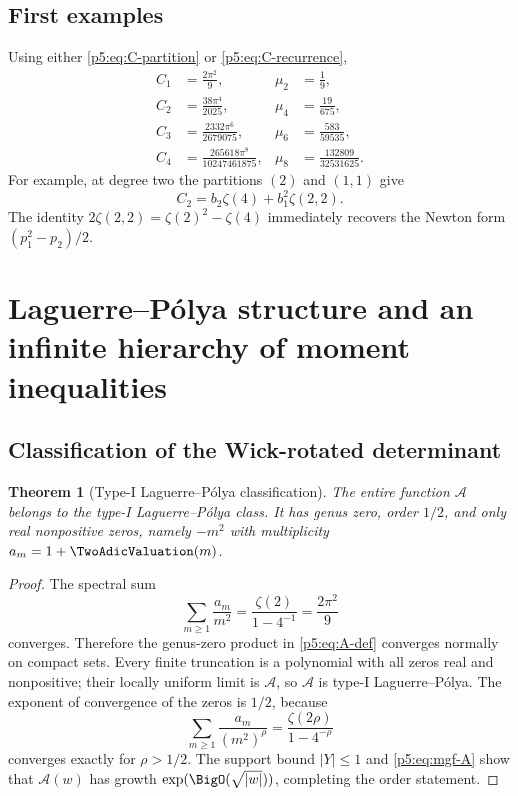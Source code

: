 \documentclass[11pt]{article}
\numberwithin{equation}{section}
\newtheorem{theorem}{Theorem}[section]
\theoremstyle{definition}
\theoremstyle{remark}
\begin{document}
\subsection{First examples}

Using either \cref{p5:eq:C-partition} or \cref{p5:eq:C-recurrence},
\begin{align}
 C_1&=\frac{2\pi^2}{9},
 &\mu_2&=\frac19,\label{p5:eq:first-moments-a}\\
 C_2&=\frac{38\pi^4}{2025},
 &\mu_4&=\frac{19}{675},\\
 C_3&=\frac{2332\pi^6}{2679075},
 &\mu_6&=\frac{583}{59535},\\
 C_4&=\frac{265618\pi^8}{10247461875},
 &\mu_8&=\frac{132809}{32531625}.\label{p5:eq:first-moments-b}
\end{align}
For example, at degree two the partitions $(2)$ and $(1,1)$ give
\begin{equation}\label{p5:eq:C2-MZV}
 C_2=b_2\zeta(4)+b_1^2\zeta(2,2).
\end{equation}
The identity $2\zeta(2,2)=\zeta(2)^2-\zeta(4)$ immediately recovers the
Newton form $(p_1^2-p_2)/2$.

\section{Laguerre--P\'olya structure and an infinite hierarchy of moment inequalities}

\subsection{Classification of the Wick-rotated determinant}

\begin{theorem}[Type-I Laguerre--P\'olya classification]\label{p5:thm:LP}
The entire function $\mathcal A$ belongs to the type-I Laguerre--P\'olya class.
It has genus zero, order $1/2$, and only real nonpositive zeros, namely
$-m^2$ with multiplicity $a_m=1+\TwoAdicValuation(m)$.
\end{theorem}

\begin{proof}
The spectral sum
\[
 \sum_{m\ge1}\frac{a_m}{m^2}=\frac{\zeta(2)}{1-4^{-1}}
 =\frac{2\pi^2}{9}
\]
converges.  Therefore the genus-zero product in \cref{p5:eq:A-def} converges
normally on compact sets.  Every finite truncation is a polynomial with all
zeros real and nonpositive; their locally uniform limit is $\mathcal A$, so
$\mathcal A$ is type-I Laguerre--P\'olya.  The exponent of convergence of the
zeros is $1/2$, because
\[
 \sum_{m\ge1}\frac{a_m}{(m^2)^\rho}
 =\frac{\zeta(2\rho)}{1-4^{-\rho}}
\]
converges exactly for $\rho>1/2$.  The support bound $|Y|\le1$ and
\cref{p5:eq:mgf-A} show that $\mathcal A(w)$ has growth
$\exp(\BigO(\sqrt{|w|}))$, completing the order statement.
\end{proof}
\end{document}
